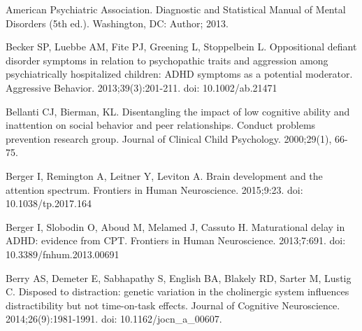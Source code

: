 \documentclass[10pt,letterpaper]{article}
\begin{document}
{{%
%
%
%
%
% 

\begin{thebibliography}{10}

American Psychiatric Association. 
\newblock Diagnostic and Statistical Manual of Mental
Disorders (5th ed.). 
\newblock Washington, DC: Author; 2013.

Becker SP, Luebbe AM, Fite PJ, Greening L,
  Stoppelbein L.
\newblock Oppositional defiant disorder symptoms in relation to psychopathic
  traits and aggression among psychiatrically hospitalized children: {ADHD}
  symptoms as a potential moderator.
\newblock Aggressive Behavior. 2013;39(3):201-211. doi: 10.1002/ab.21471

Bellanti CJ, Bierman, KL.
\newblock Disentangling the impact of low cognitive ability and inattention on
  social behavior and peer relationships. Conduct problems prevention research
  group.
\newblock Journal of Clinical Child Psychology. 2000;29(1), 66-75.

Berger I, Remington A, Leitner Y, Leviton A.
\newblock Brain development and the attention spectrum.
\newblock Frontiers in Human Neuroscience. 2015;9:23. doi: 10.1038/tp.2017.164

Berger I, Slobodin O, Aboud M, Melamed J, Cassuto H.
\newblock Maturational delay in {ADHD}: evidence from {CPT}.
\newblock Frontiers in Human Neuroscience. 2013;7:691. doi: 10.3389/fnhum.2013.00691

Berry AS, Demeter E, Sabhapathy S, English BA,
  Blakely RD, Sarter M, Lustig C.
\newblock Disposed to distraction: genetic variation in the cholinergic system
  influences distractibility but not time-on-task effects.
\newblock Journal of Cognitive Neuroscience. 2014;26(9):1981-1991.  doi: 10.1162/jocn\_a\_00607.


\end{thebibliography}}}
\end{document}

